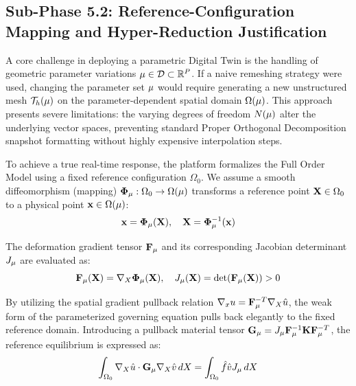 \subsection{Sub-Phase 5.2: Reference-Configuration Mapping and Hyper-Reduction Justification}
\label{subsec:geometric_parameterization}

A core challenge in deploying a parametric Digital Twin is the handling of geometric parameter variations $\mathbf{\mu} \in \mathcal{D} \subset \mathbb{R}^P$. If a naive remeshing strategy were used, changing the parameter set $\mathbf{\mu}$ would require generating a new unstructured mesh $\mathcal{T}_h(\mathbf{\mu})$ on the parameter-dependent spatial domain $\Omega(\mathbf{\mu})$. This approach presents severe limitations: the varying degrees of freedom $N(\mathbf{\mu})$ alter the underlying vector spaces, preventing standard Proper Orthogonal Decomposition snapshot formatting without highly expensive interpolation steps.

To achieve a true real-time response, the platform formalizes the Full Order Model using a fixed reference configuration $\Omega_0$. We assume a smooth diffeomorphism (mapping) $\boldsymbol{\Phi}_{\mathbf{\mu}}: \Omega_0 \to \Omega(\mathbf{\mu})$ transforms a reference point $\mathbf{X} \in \Omega_0$ to a physical point $\mathbf{x} \in \Omega(\mathbf{\mu})$:
\begin{equation}
    \mathbf{x} = \boldsymbol{\Phi}_{\mathbf{\mu}}(\mathbf{X}), \quad \mathbf{X} = \boldsymbol{\Phi}_{\mathbf{\mu}}^{-1}(\mathbf{x})
\end{equation}

The deformation gradient tensor $\mathbf{F}_{\mathbf{\mu}}$ and its corresponding Jacobian determinant $J_{\mathbf{\mu}}$ are evaluated as:
\begin{equation}
    \mathbf{F}_{\mathbf{\mu}}(\mathbf{X}) = \nabla_X \boldsymbol{\Phi}_{\mathbf{\mu}}(\mathbf{X}), \quad J_{\mathbf{\mu}}(\mathbf{X}) = \det(\mathbf{F}_{\mathbf{\mu}}(\mathbf{X})) > 0
\end{equation}

By utilizing the spatial gradient pullback relation $\nabla_x u = \mathbf{F}_{\mathbf{\mu}}^{-T} \nabla_X \hat{u}$, the weak form of the parameterized governing equation pulls back elegantly to the fixed reference domain. Introducing a pullback material tensor $\mathbf{G}_{\mathbf{\mu}} = J_{\mathbf{\mu}} \mathbf{F}_{\mathbf{\mu}}^{-1} \mathbf{K} \mathbf{F}_{\mathbf{\mu}}^{-T}$, the reference equilibrium is expressed as:
\begin{equation}
    \int_{\Omega_0} \nabla_X \hat{u} \cdot \mathbf{G}_{\mathbf{\mu}} \nabla_X \hat{v} \, dX = \int_{\Omega_0} \hat{f} \hat{v} J_{\mathbf{\mu}} \, dX
\end{equation}

